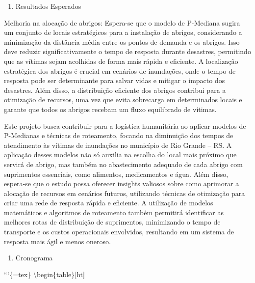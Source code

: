 \documentclass[
]{article}
\providecommand{\tightlist}{%
  \setlength{\itemsep}{0pt}\setlength{\parskip}{0pt}}
\begin{document}
\begin{enumerate}
\def\labelenumi{\arabic{enumi}.}
\setcounter{enumi}{4}
\tightlist
\item
  Resultados Esperados
\end{enumerate}

Melhoria na alocação de abrigos: Espera-se que o modelo de P-Mediana
sugira um conjunto de locais estratégicos para a instalação de abrigos,
considerando a minimização da distância média entre os pontos de demanda
e os abrigos. Isso deve reduzir significativamente o tempo de resposta
durante desastres, permitindo que as vítimas sejam acolhidas de forma
mais rápida e eficiente. A localização estratégica dos abrigos é crucial
em cenários de inundações, onde o tempo de resposta pode ser
determinante para salvar vidas e mitigar o impacto dos desastres. Além
disso, a distribuição eficiente dos abrigos contribui para a otimização
de recursos, uma vez que evita sobrecarga em determinados locais e
garante que todos os abrigos recebam um fluxo equilibrado de vítimas.

Este projeto busca contribuir para a logística humanitária ao aplicar
modelos de P-Medianas e técnicas de roteamento, focando na diminuição
dos tempos de atendimento às vítimas de inundações no município de Rio
Grande -- RS. A aplicação desses modelos não só auxilia na escolha do
local mais próximo que servirá de abrigo, mas também no abastecimento
adequado de cada abrigo com suprimentos essenciais, como alimentos,
medicamentos e água. Além disso, espera-se que o estudo possa oferecer
insights valiosos sobre como aprimorar a alocação de recursos em
cenários futuros, utilizando técnicas de otimização para criar uma rede
de resposta rápida e eficiente. A utilização de modelos matemáticos e
algoritmos de roteamento também permitirá identificar as melhores rotas
de distribuição de suprimentos, minimizando o tempo de transporte e os
custos operacionais envolvidos, resultando em um sistema de resposta
mais ágil e menos oneroso.

\begin{enumerate}
\def\labelenumi{\arabic{enumi}.}
\setcounter{enumi}{5}
\tightlist
\item
  Cronograma
\end{enumerate}

```\{=tex\} \textbackslash begin\{table\}{[}ht{]} \centering
\end{document}
